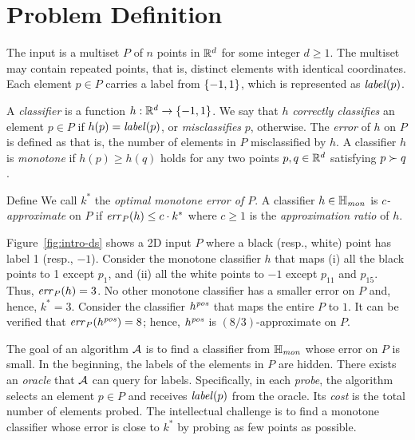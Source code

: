 \section{Problem Definition} \label{sec:prob}

The input is a multiset $P$ of $n$ points in $\mathbb{R}^d$ for some integer $d \ge 1$. The multiset may contain repeated points, that is, distinct elements with identical coordinates. Each element $p \in P$ carries a label from $\{-1, 1\}$, which is represented as $\mathit{label}(p)$.

\vgap

A {\em classifier} is a function $h: \mathbb{R}^d \rightarrow \{-1, 1\}$. We say that $h$ {{\em correctly classifies}} an element $p \in P$ if $h(p) = \mathit{label}(p)$, or {\em misclassifies} $p$, otherwise. The {\em error} of $h$ on $P$ is defined as
that is, the number of elements in $P$ misclassified by $h$. A classifier $h$ is {\em monotone} if $h(p) \ge h(q)$ holds for any two points $p, q \in \mathbb{R}^d$ satisfying $p \succ q$.

\vgap

Define
We call $k^*$ the {\em optimal monotone error of $P$}. A classifier $h \in \mathbb{H}_\mathit{mon}$ is {\em $c$-approximate} on $P$ if $\mathit{err}_P(h) \le c \cdot k^*$ where $c \ge 1$ is the {\em approximation ratio} of $h$.


\vgap

    Figure~\ref{fig:intro-ds} shows a 2D input $P$ where a black (resp., white) point has label 1 (resp., $-1$). Consider the monotone classifier $h$ that maps (i) all the black points to 1 except $p_1$, and (ii) all the white points to $-1$ except $p_{11}$ and $p_{15}$. Thus, $\mathit{err}_P(h) = 3$. No other monotone classifier has a smaller error on $P$ and, hence, $k^* = 3$. Consider the classifier $h^\mathit{pos}$ that maps the entire $P$ to $1$. It can be verified that $\mathit{err}_P(h^\mathit{pos}) = {8}$; hence, $h^\mathit{pos}$ is ${(8/3)}$-approximate on $P$. %

\vgap

The goal of an algorithm $\mathcal{A}$ is to find a classifier from $\mathbb{H}_\mathit{mon}$ whose error on $P$ is small. In the beginning, the labels of the elements in $P$ are hidden. There exists an {\em oracle} that $\mathcal{A}$ can query for labels. Specifically, in each {\em probe}, the algorithm selects an element $p \in P$ and receives $\mathit{label}(p)$ from the oracle. Its {\em cost} is the total number of elements probed. The intellectual challenge is to find a monotone classifier whose error is close to $k^*$ by probing as few points as possible.

